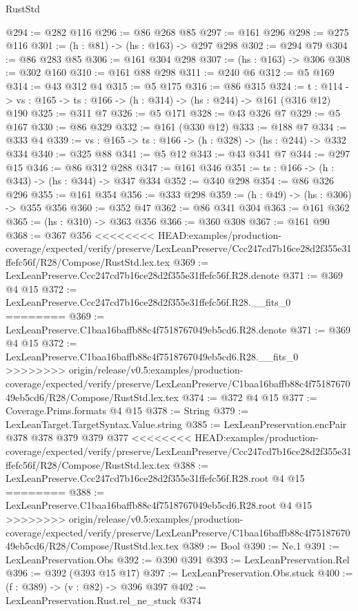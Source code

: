 \begin{lexlean}{RustStd}
\begin{coremodule}
{\begin{coremodule}
@294 := @282 @116
@296 := @86 @268 @85
@297 := @161 @296
@298 := @275 @116
@301 := (h : @81) -> (hs : @163) -> @297 @298
@302 := @294 @79
@304 := @86 @283 @85
@306 := @161 @304 @298
@307 := (hs : @163) -> @306
@308 := @302 @160
@310 := @161 @88 @298
@311 := @240 @6
@312 := @5 @169
@314 := @43 @312 @4
@315 := @5 @175
@316 := @86 @315
@324 := {t : @114} ->
  {vs : @165} -> {ts : @166} -> (h : @314) -> (hs : @244) -> @161 (@316 @12) @190
@325 := @311 @7
@326 := @5 @171
@328 := @43 @326 @7
@329 := @5 @167
@330 := @86 @329
@332 := @161 (@330 @12)
@333 := @188 @7
@334 := @333 @4
@339 := {vs : @165} -> {ts : @166} -> (h : @328) -> (hs : @244) -> @332 @334
@340 := @325 @88
@341 := @5 @12
@343 := @43 @341 @7
@344 := @297 @15
@346 := @86 @312 @288
@347 := @161 @346
@351 := {ts : @166} -> (h : @343) -> (hs : @344) -> @347 @334
@352 := @340 @298
@354 := @86 @326 @296
@355 := @161 @354
@356 := @333 @298
@359 := (h : @49) -> (hs : @306) -> @355 @356
@360 := @352 @47
@362 := @86 @341 @304
@363 := @161 @362
@365 := (hs : @310) -> @363 @356
@366 := @360 @308
@367 := @161 @90
@368 := @367 @356
<<<<<<<< HEAD:examples/production-coverage/expected/verify/preserve/LexLeanPreserve/Ccc247cd7b16ce28d2f355e31ffefc56f/R28/Compose/RustStd.lex.tex
@369 := LexLeanPreserve.Ccc247cd7b16ce28d2f355e31ffefc56f.R28.denote
@371 := @369 @4 @15
@372 := LexLeanPreserve.Ccc247cd7b16ce28d2f355e31ffefc56f.R28.__fits_0
========
@369 := LexLeanPreserve.C1baa16baffb88c4f7518767049eb5cd6.R28.denote
@371 := @369 @4 @15
@372 := LexLeanPreserve.C1baa16baffb88c4f7518767049eb5cd6.R28.__fits_0
>>>>>>>> origin/release/v0.5:examples/production-coverage/expected/verify/preserve/LexLeanPreserve/C1baa16baffb88c4f7518767049eb5cd6/R28/Compose/RustStd.lex.tex
@374 := @372 @4 @15
@377 := Coverage.Prims.formats @4 @15
@378 := String
@379 := LexLeanTarget.TargetSyntax.Value.string
@385 := LexLeanPreservation.encPair @378 @378 @379 @379 @377
<<<<<<<< HEAD:examples/production-coverage/expected/verify/preserve/LexLeanPreserve/Ccc247cd7b16ce28d2f355e31ffefc56f/R28/Compose/RustStd.lex.tex
@388 := LexLeanPreserve.Ccc247cd7b16ce28d2f355e31ffefc56f.R28.root @4 @15
========
@388 := LexLeanPreserve.C1baa16baffb88c4f7518767049eb5cd6.R28.root @4 @15
>>>>>>>> origin/release/v0.5:examples/production-coverage/expected/verify/preserve/LexLeanPreserve/C1baa16baffb88c4f7518767049eb5cd6/R28/Compose/RustStd.lex.tex
@389 := Bool
@390 := Ne.{1}
@391 := LexLeanPreservation.Obs
@392 := @390 @391
@393 := LexLeanPreservation.Rel
@396 := @392 (@393 @15 @17)
@397 := LexLeanPreservation.Obs.stuck
@400 := (f : @389) -> (v : @82) -> @396 @397
@402 := LexLeanPreservation.Rust.rel_ne_stuck @374

\end{coremodule}}
\end{coremodule}
\end{lexlean}
